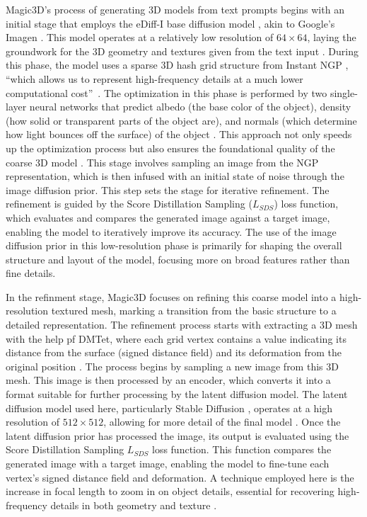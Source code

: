 Magic3D's process of generating 3D models from text prompts begins with an initial stage that employs the eDiff-I base diffusion model \citep{balaji2022eDiff-I}, akin to Google's Imagen \citep{saharia2022imagen}. This model operates at a relatively low resolution of \(64 \times 64\), laying the groundwork for the 3D geometry and textures given from the text input \citep{lin2023magic3d}. During this phase, the model uses a sparse 3D hash grid structure from Instant NGP \citep{mueller2022instant}, ``which allows us to represent high-frequency details at a much lower computational cost''~\citep{lin2023magic3d}. The optimization in this phase is performed by two single-layer neural networks that predict albedo (the base color of the object), density (how solid or transparent parts of the object are), and normals (which determine how light bounces off the surface) of the object \citep{lin2023magic3d}. This approach not only speeds up the optimization process but also ensures the foundational quality of the coarse 3D model \citep{lin2023magic3d}. 
This stage involves sampling an image from the NGP representation, which is then infused with an initial state of noise through the image diffusion prior. This step sets the stage for iterative refinement. The refinement is guided by the Score Distillation Sampling (\(L_{SDS}\)) loss function, which evaluates and compares the generated image against a target image, enabling the model to iteratively improve its accuracy. The use of the image diffusion prior in this low-resolution phase is primarily for shaping the overall structure and layout of the model, focusing more on broad features rather than fine details.

In the refinment stage, Magic3D focuses on refining this coarse model into a high-resolution textured mesh, marking a transition from the basic structure to a detailed representation. The refinement process starts with extracting a 3D mesh with the help pf DMTet, where each grid vertex contains a value indicating its distance from the surface (signed distance field) and its deformation from the original position \citep{shen2021DMTet, lin2023magic3d}. The process begins by sampling a new image from this 3D mesh. This image is then processed by an encoder, which converts it into a format suitable for further processing by the latent diffusion model. The latent diffusion model used here, particularly Stable Diffusion \citep{rombachStableDiffusion}, operates at a high resolution of \(512 \times 512\), allowing for more detail of the final model \citep{lin2023magic3d}. Once the latent diffusion prior has processed the image, its output is evaluated using the Score Distillation Sampling \(L_{SDS}\) loss function. This function compares the generated image with a target image, enabling the model to fine-tune each vertex's signed distance field and deformation. A technique employed here is the increase in focal length to zoom in on object details, essential for recovering high-frequency details in both geometry and texture \citep{lin2023magic3d}.

